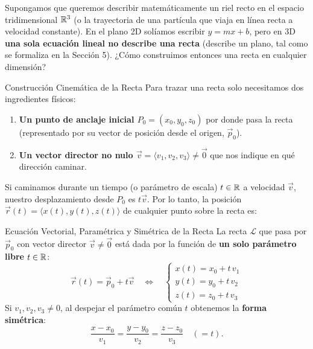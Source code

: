 \documentclass[11pt,letterpaper]{article}
\begin{document}

Supongamos que queremos describir matemáticamente un riel recto en el espacio tridimensional $\mathbb{R}^3$ (o la trayectoria de una partícula que viaja en línea recta a velocidad constante). En el plano 2D solíamos escribir $y = mx + b$, pero en 3D \textbf{una sola ecuación lineal no describe una recta} (describe un plano, tal como se formaliza en la Sección 5). ¿Cómo construimos entonces una recta en cualquier dimensión?

\begin{infobox}{Construcción Cinemática de la Recta}
Para trazar una recta solo necesitamos dos ingredientes físicos:
\begin{enumerate}
    \item \textbf{Un punto de anclaje inicial $P_0 = (x_0, y_0, z_0)$} por donde pasa la recta (representado por su vector de posición desde el origen, $\vec{p}_0$).
    \item \textbf{Un vector director no nulo $\vec{v} = \langle v_1, v_2, v_3 \rangle \neq \vec{0}$} que nos indique en qué dirección caminar.
\end{enumerate}
Si caminamos durante un tiempo (o parámetro de escala) $t \in \mathbb{R}$ a velocidad $\vec{v}$, nuestro desplazamiento desde $P_0$ es $t\vec{v}$. Por lo tanto, la posición $\vec{r}(t) = \langle x(t), y(t), z(t) \rangle$ de cualquier punto sobre la recta es:
\end{infobox}

\begin{theorembox}{Ecuación Vectorial, Paramétrica y Simétrica de la Recta}
La recta $\mathcal{L}$ que pasa por $\vec{p}_0$ con vector director $\vec{v} \neq \vec{0}$ está dada por la función de \textbf{un solo parámetro libre} $t \in \mathbb{R}$:
\[
\vec{r}(t) = \vec{p}_0 + t\vec{v} \quad \Longleftrightarrow \quad
\begin{cases}
x(t) = x_0 + t\,v_1 \\
y(t) = y_0 + t\,v_2 \\
z(t) = z_0 + t\,v_3
\end{cases}
\]
Si $v_1, v_2, v_3 \neq 0$, al despejar el parámetro común $t$ obtenemos la \textbf{forma simétrica}:
\[
\frac{x - x_0}{v_1} = \frac{y - y_0}{v_2} = \frac{z - z_0}{v_3} \quad (= t).
\]
\end{theorembox}
\end{document}
